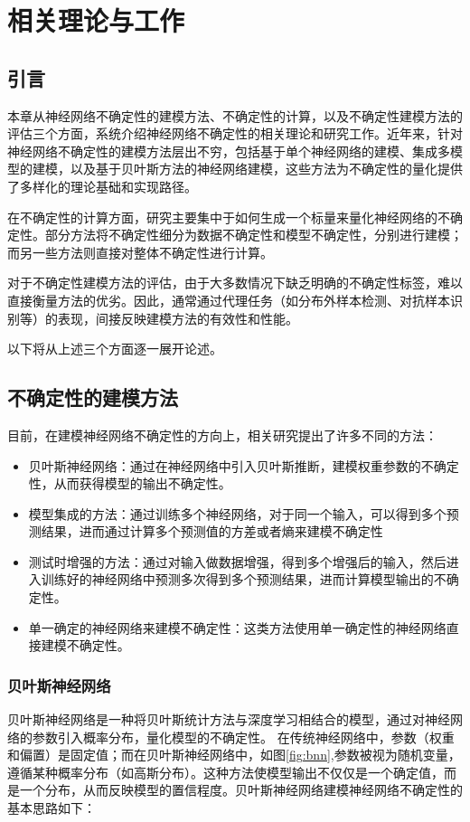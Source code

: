 \chapter{相关理论与工作}
\section{引言}
本章从神经网络不确定性的建模方法、不确定性的计算，以及不确定性建模方法的评估三个方面，系统介绍神经网络不确定性的相关理论和研究工作。近年来，针对神经网络不确定性的建模方法层出不穷，包括基于单个神经网络的建模、集成多模型的建模，以及基于贝叶斯方法的神经网络建模，这些方法为不确定性的量化提供了多样化的理论基础和实现路径。

在不确定性的计算方面，研究主要集中于如何生成一个标量来量化神经网络的不确定性。部分方法将不确定性细分为数据不确定性和模型不确定性，分别进行建模；而另一些方法则直接对整体不确定性进行计算。

对于不确定性建模方法的评估，由于大多数情况下缺乏明确的不确定性标签，难以直接衡量方法的优劣。因此，通常通过代理任务（如分布外样本检测、对抗样本识别等）的表现，间接反映建模方法的有效性和性能。

以下将从上述三个方面逐一展开论述。


\section{不确定性的建模方法}
目前，在建模神经网络不确定性的方向上，相关研究提出了许多不同的方法：
\begin{itemize}
    \item 贝叶斯神经网络：通过在神经网络中引入贝叶斯推断，建模权重参数的不确定性，从而获得模型的输出不确定性。
    \item 模型集成的方法：通过训练多个神经网络，对于同一个输入，可以得到多个预测结果，进而通过计算多个预测值的方差或者熵来建模不确定性
    \item 测试时增强的方法：通过对输入做数据增强，得到多个增强后的输入，然后进入训练好的神经网络中预测多次得到多个预测结果，进而计算模型输出的不确定性。
    \item 单一确定的神经网络来建模不确定性：这类方法使用单一确定性的神经网络直接建模不确定性。
\end{itemize}

\subsection{贝叶斯神经网络}
贝叶斯神经网络\cite{goan2020bayesian}\cite{mackay1996bayesian}\cite{jospin2022hands}是一种将贝叶斯统计方法与深度学习相结合的模型，通过对神经网络的参数引入概率分布，量化模型的不确定性。 在传统神经网络中，参数（权重和偏置）是固定值；而在贝叶斯神经网络中，如图\ref{fig:bnn},参数被视为随机变量，遵循某种概率分布（如高斯分布）。这种方法使模型输出不仅仅是一个确定值，而是一个分布，从而反映模型的置信程度。贝叶斯神经网络建模神经网络不确定性的基本思路如下：

